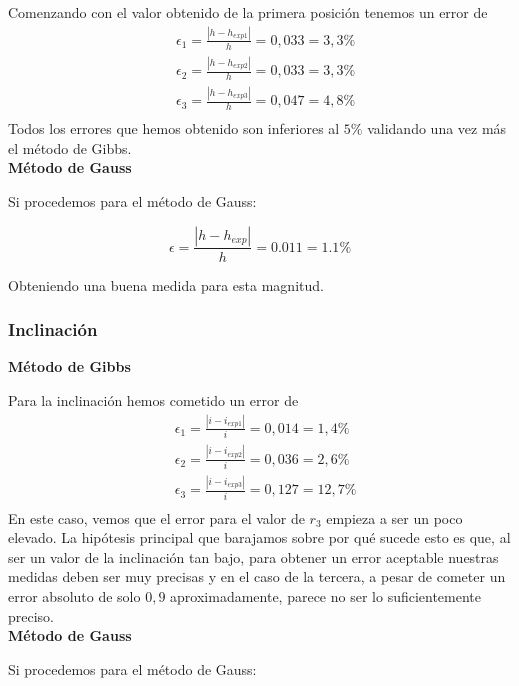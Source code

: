 \documentclass{article}
\numberwithin{equation}{section}
\begin{document}
Comenzando con el valor obtenido de la primera posición tenemos 
un error de 
\begin{align*}
    &\epsilon_{1}=\frac{\left\lvert h-h_{exp1} \right\rvert }{h}=0,033=3,3\% \\
    &\epsilon_{2}=\frac{\left\lvert h-h_{exp2} \right\rvert }{h}=0,033=3,3\% \\
    &\epsilon_{3}=\frac{\left\lvert h-h_{exp3} \right\rvert }{h}=0,047=4,8\% \\
\end{align*}
Todos los errores que hemos obtenido son inferiores al $5\%$ 
validando una vez más el método de Gibbs.\\

\noindent\textbf{Método de Gauss}\par
Si procedemos para el método de Gauss:

\begin{equation*}
    \epsilon=\frac{\left\lvert h-h_{exp} \right\rvert}{h}=0.011=1.1\%
\end{equation*}

Obteniendo una buena medida para esta magnitud.

\subsubsection{Inclinación}
\noindent\textbf{Método de Gibbs}\par
Para la inclinación hemos cometido un error de 
\begin{align*}
    &\epsilon_{1}=\frac{\left\lvert i-i_{exp1} \right\rvert }{i}=0,014=1,4\% \\
    &\epsilon_{2}=\frac{\left\lvert i-i_{exp2} \right\rvert }{i}=0,036=2,6\% \\
    &\epsilon_{3}=\frac{\left\lvert i-i_{exp3} \right\rvert }{i}=0,127=12,7\% \\
\end{align*}
En este caso, vemos que el error para el valor de $r_{3}$ empieza 
a ser un poco elevado. La hipótesis principal que barajamos 
sobre por qué sucede esto es que, al ser un valor de la inclinación 
tan bajo, para obtener un error aceptable nuestras medidas deben 
ser muy precisas y en el caso de la tercera, a pesar de cometer 
un error absoluto de solo $0,9$ aproximadamente, parece no 
ser lo suficientemente preciso.\\

\noindent\textbf{Método de Gauss}\par
Si procedemos para el método de Gauss:
\end{document}
